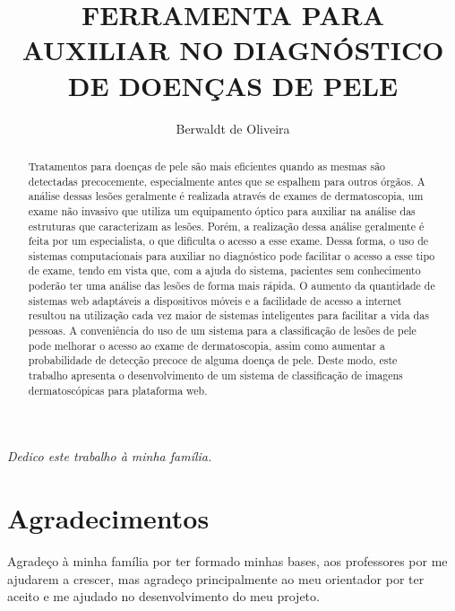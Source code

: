 \documentclass[openright]{ifrs} %
\author{Berwaldt de Oliveira}{Augusto}
\title{FERRAMENTA PARA AUXILIAR NO DIAGNÓSTICO DE DOENÇAS DE PELE}
\begin{document}
\maketitle

\clearpage
\begin{flushright}
\mbox{}\vfill
{\sffamily\itshape
Dedico este trabalho à minha família.}
\end{flushright}

\chapter*{Agradecimentos}
Agradeço  à minha família por ter formado minhas bases, aos professores
por me ajudarem a crescer, mas agradeço principalmente ao meu orientador  por 
ter aceito e me ajudado no desenvolvimento do meu projeto.
\begin{abstract}
Tratamentos para doenças de pele são mais eficientes quando  as mesmas são detectadas precocemente,
especialmente antes que se espalhem para outros órgãos.
A análise dessas lesões geralmente é realizada através de exames de dermatoscopia, 
um exame não invasivo que utiliza um equipamento óptico para auxiliar na análise das estruturas que caracterizam as lesões.
Porém, a realização dessa análise geralmente é feita por um especialista, o que dificulta o acesso a esse exame.
Dessa forma, o uso de sistemas computacionais para auxiliar no diagnóstico pode facilitar o acesso a esse tipo de exame, tendo em vista que, com a ajuda do sistema, pacientes sem conhecimento  poderão ter uma análise das lesões de forma mais rápida. O aumento da quantidade de sistemas web adaptáveis a dispositivos móveis e a facilidade de acesso a internet resultou na utilização cada vez maior de  sistemas inteligentes para facilitar a vida das pessoas. A conveniência do uso de um sistema para a classificação de lesões de pele pode melhorar o acesso ao exame de dermatoscopia,
assim como aumentar a probabilidade de detecção precoce de alguma doença de pele.
Deste modo, este trabalho apresenta o desenvolvimento de um sistema de classificação de imagens dermatoscópicas para plataforma web.
 \end{abstract}
\end{document}
